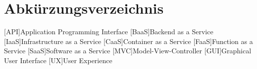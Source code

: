 \clearpage
\chapter*{Abkürzungsverzeichnis}	

\begin{acronym}[XXXXXXX]
	[API]{Application Programming Interface}
	[BaaS]{Backend as a Service}
	[IaaS]{Infrastructure as a Service}
	[CaaS]{Container as a Service}
	[FaaS]{Function as a Service}
	[SaaS]{Software as a Service}
	[MVC]{Model-View-Controller}
	[GUI]{Graphical User Interface}
	[UX]{User Experience}
\end{acronym}